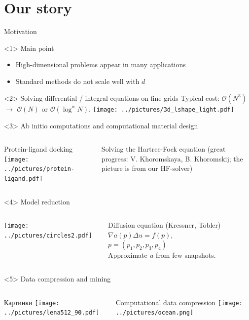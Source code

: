\documentclass{beamer}[14pt, presentation]
\begin{document}
\section{Our story}
\label{sec-2}
\begin{frame}[label=sec-2-1]{Motivation}
\begin{onlyenv}<1>
\alert{Main point}
\begin{itemize}
\item High-dimensional problems appear in many applications
\item Standard methods do not scale well with $d$
\end{itemize}
\end{onlyenv}

\begin{onlyenv}<2>
Solving differential / integral equations on fine grids
  \vskip 2mm
 Typical cost: \alert{$\mathcal{O}(N^3)$} $\rightarrow$
  \alert{$\mathcal{O}(N)$} or \alert{$\mathcal{O}(\log^{\alpha} N)$}.
\texttt{[image: ../pictures/3d\_lshape\_light.pdf]}
\end{onlyenv}

\begin{onlyenv}<3>
Ab initio computations and computational material design
\begin{columns}
\begin{column}{0.45\linewidth}
Protein-ligand docking
\texttt{[image: ../pictures/protein-ligand.pdf]}
\end{column}
\begin{column}{0.45\linewidth}
Solving the Hartree-Fock equation (great progress: V. Khoromskaya, B. Khoromskij; the picture is from our HF-solver)
\end{column}
\end{columns}
\end{onlyenv}
\begin{onlyenv}<4>
Model reduction
\begin{columns}
\begin{column}{0.45\linewidth}
\texttt{[image: ../pictures/circles2.pdf]}
\end{column}
\begin{column}{0.45\linewidth}
\alert{Diffusion equation (Kressner, Tobler)} 
\vskip 2mm
$\nabla a(p) \Delta u = f(p)$, \\
$p = (p_1,p_2,p_3,p_4)$ \\
Approximate $u$ from few snapshots.
\end{column}
\end{columns}
\end{onlyenv}
\begin{onlyenv}<5>
Data compression and mining
\begin{columns}
\begin{column}{0.45\linewidth}
Картинки
\texttt{[image: ../pictures/lena512\_90.pdf]}
\end{column}
\begin{column}{0.45\linewidth}
Computational data compression
\texttt{[image: ../pictures/ocean.png]}
\end{column}
\end{columns}
\end{onlyenv}
\end{frame}
\end{document}
